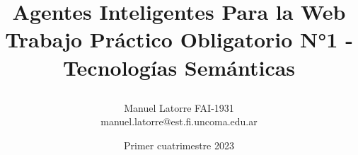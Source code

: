 \begin{titlepage}
  \title{\textbf{Agentes Inteligentes Para la Web}\\
  \large{\textbf{Trabajo Práctico Obligatorio N°1 - Tecnologías Semánticas}}
  \author{
  Manuel Latorre FAI-1931\\ manuel.latorre@est.fi.uncoma.edu.ar\vspace{3mm}\\
  }}
  \date{Primer cuatrimestre 2023}

  \maketitle
  \vspace{25mm}
  \vfill
\end{titlepage}

\titlepage

\newpage

\pagebreak